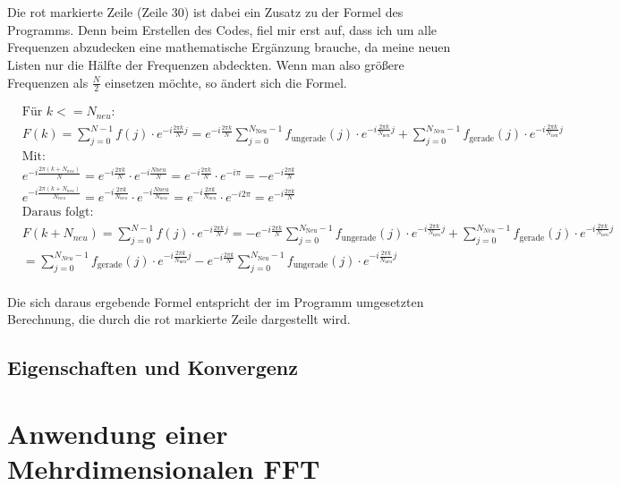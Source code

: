 \documentclass[a4paper,12pt]{article}
\theoremstyle{definition}
\theoremstyle{remark}
\begin{document}
\\\\
Die rot markierte Zeile (Zeile 30) ist dabei ein Zusatz zu der Formel des Programms. Denn beim Erstellen des Codes, 
fiel mir erst auf, dass ich um alle Frequenzen abzudecken eine mathematische Ergänzung brauche, da meine neuen Listen 
nur die Hälfte der Frequenzen abdeckten. Wenn man also größere Frequenzen als $\frac{N}{2}$ einsetzen möchte, so ändert 
sich die Formel. 

\begin{align*}
&\text{Für $k <= N_{neu}$:}\\
&F(k) = \sum_{j=0}^{N-1}{f(j)\cdot e^{-i \frac{2\pi k}{N} j}} = e^{-i \frac{2\pi k}{N}} \sum_{j=0}^{N_{\text{Neu}}-1}{f_{\text{ungerade}}(j)\cdot e^{-i \frac{2\pi k}{N_{\text{neu}}} j}} + \sum_{j=0}^{N_{Neu}-1}{f_{\text{gerade}}(j)\cdot e^{-i \frac{2\pi k}{N_{\text{neu}}} j}}\\
&\text{Mit: }\\
&e^{-i \frac{2\pi(k+N_{neu})}{N}} = e^{-i \frac{2\pi k}{N}} \cdot e^{-i \frac{N{neu}}{N}} = e^{-i \frac{2\pi k}{N}} \cdot e^{-i\pi} = -e^{-i \frac{2\pi k}{N}}\\
&e^{-i \frac{2\pi(k+N_{neu})}{N_{neu}}} = e^{-i \frac{2\pi k}{N_{neu}}} \cdot e^{-i \frac{N{neu}}{N_{neu}}} = e^{-i \frac{2\pi k}{N_{neu}}} \cdot e^{-i2\pi} = e^{-i  \frac{2\pi k}{N}}\\
&\text{Daraus folgt: }\\
&F(k+N_{neu}) = \sum_{j=0}^{N-1}{f(j)\cdot e^{-i \frac{2\pi k}{N} j}} = -e^{-i \frac{2\pi k}{N}} \sum_{j=0}^{N_{\text{Neu}}-1}{f_{\text{ungerade}}(j)\cdot e^{-i \frac{2\pi k}{N_{\text{neu}}} j}} + \sum_{j=0}^{N_{Neu}-1}{f_{\text{gerade}}(j)\cdot e^{-i \frac{2\pi k}{N_{\text{neu}}} j}}\\
&= \sum_{j=0}^{N_{Neu}-1}{f_{\text{gerade}}(j)\cdot e^{-i \frac{2\pi k}{N_{\text{neu}}} j}} - e^{-i \frac{2\pi k}{N}} \sum_{j=0}^{N_{\text{Neu}}-1}{f_{\text{ungerade}}(j)\cdot e^{-i \frac{2\pi k}{N_{\text{neu}}} j}} \\
\end{align*}

Die sich daraus ergebende Formel entspricht der im Programm umgesetzten Berechnung, die durch die rot markierte Zeile 
dargestellt wird.

\subsection{Eigenschaften und Konvergenz}

\section{Anwendung einer Mehrdimensionalen FFT}
\end{document}
